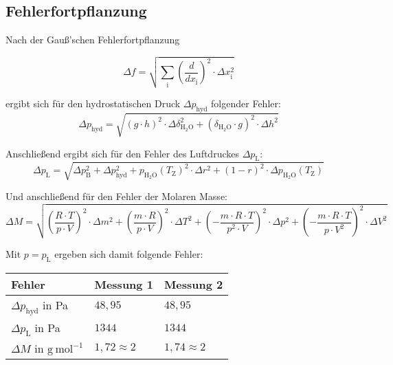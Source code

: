 \documentclass[12pt,a4paper,titlepage,headinclude,bibtotoc]{scrartcl}
\begin{document}
\subsection{Fehlerfortpflanzung}

Nach der Gauß'schen Fehlerfortpflanzung

\begin{equation}
\Delta f = \sqrt{\sum_\mathrm{i} \left(\frac{d}{dx_\mathrm{i}}\right)^{2} \cdot \Delta x_\mathrm{i}^2}
\end{equation}


ergibt sich für den hydrostatischen Druck $\Delta p_\mathrm{hyd}$ folgender Fehler:\\

\begin{equation}
\Delta p_\mathrm{hyd} =  \sqrt{(g \cdot h)^2 \cdot \Delta \delta_\mathrm{H_2O}^2 + (\delta_\mathrm{H_2O} \cdot g)^2 \cdot \Delta h^2}
\end{equation}


Anschließend ergibt sich für den Fehler des Luftdruckes $\Delta p_\mathrm{L}$:\\


\begin{equation}
\Delta p_\mathrm{L} = \sqrt{\Delta p_\mathrm{B}^2 + \Delta p_\mathrm{hyd}^2 + p_\mathrm{H_2O}(T_\mathrm{Z})^2 \cdot \Delta r^2 + (1-r)^2 \cdot \Delta p_\mathrm{H_2O}(T_\mathrm{Z})}
\end{equation}

Und anschließend für den Fehler der Molaren Masse:\\

\begin{equation}
\Delta M = \sqrt{\left(\frac{R\cdot T}{p\cdot V}\right)^2 \cdot \Delta m^2 + \left(\frac{m\cdot R}{p\cdot V} \right)^2 \cdot \Delta T^2 + \left(-\frac{m\cdot R\cdot T}{p^2 \cdot V}\right)^2 \cdot \Delta p^2 + \left(-\frac{m \cdot R \cdot T}{p \cdot V^2} \right)^2 \cdot \Delta V^2}
\end{equation}

Mit $p = p_\mathrm{L}$ ergeben sich damit folgende Fehler:\\

\begin{table} [h]
\centering
\begin{tabular}{|p{4 cm}||p{4 cm}|p{4 cm}|}
        \hline
		Fehler & Messung 1 & Messung 2\\
         \hline 
        $\Delta p_\mathrm{hyd}$ in Pa & $48,95$  & $48,95$ \\
        \hline
        $\Delta p_\mathrm{L}   $ in Pa & $1344$  & $1344$ \\
        \hline
        $\Delta M $ in $\mathrm{g{~}mol^{-1}}$ & $1,72 \approx 2$ & $1,74 \approx 2$ \\
        \hline     
\end{tabular}
\end{table}
\end{document}
